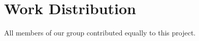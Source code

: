 \documentclass{vldb}
\begin{document}

\section{Work Distribution}

All members of our group contributed equally to this project.


\newcommand{\newblock}{}

\newpage
\balance


\end{document}
